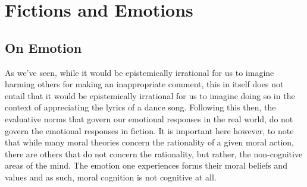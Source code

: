 \documentclass[phdthesis,12pt,final]{wuthesis}
\theoremstyle{definition}
\theoremstyle{definition}
\theoremstyle{definition}
\theoremstyle{definition}
\theoremstyle{remark}
\begin{document}
\section{Fictions and Emotions}\label{fictions-and-emotions}

\subsection*{On Emotion}\label{on-emotion}

As we've seen, while it would be epistemically irrational for us to imagine harming others for making an inappropriate comment, this in itself does not entail that it would be epistemically irrational for us to imagine doing so in the context of appreciating the lyrics of a dance song. Following this then, the evaluative norms that govern our emotional responses in the real world, do not govern the emotional responses in fiction. It is important here however, to note that while many moral theories concern the rationality of a given moral action, there are others that do not concern the rationality, but rather, the non-cognitive areas of the mind. The emotion one experiences forms their moral beliefs and values and as such, moral cognition is not cognitive at all.
\end{document}
